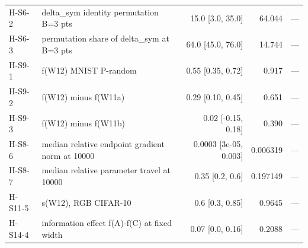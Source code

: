 \begin{table}[t]
\begin{tabular}{@{}llrrl@{}}
H-S6-2 & delta\_sym identity permutation B=3 pts & 15.0 [3.0, 35.0] & 64.044 & --- \\
H-S6-3 & permutation share of delta\_sym at B=3 pts & 64.0 [45.0, 76.0] & 14.744 & --- \\
H-S9-1 & f(W12) MNIST P-random & 0.55 [0.35, 0.72] & 0.917 & --- \\
H-S9-2 & f(W12) minus f(W11a) & 0.29 [0.10, 0.45] & 0.651 & --- \\
H-S9-3 & f(W12) minus f(W11b) & 0.02 [-0.15, 0.18] & 0.390 & --- \\
H-S8-6 & median relative endpoint gradient norm at 10000 & 0.0003 [3e-05, 0.003] & 0.006319 & --- \\
H-S8-7 & median relative parameter travel at 10000 & 0.35 [0.2, 0.6] & 0.197149 & --- \\
H-S11-5 & s(W12), RGB CIFAR-10 & 0.6 [0.3, 0.85] & 0.9645 & --- \\
H-S14-4 & information effect f(A)-f(C) at fixed width & 0.07 [0.0, 0.16] & 0.2088 & --- \\
\bottomrule
\end{tabular}
\end{table}
